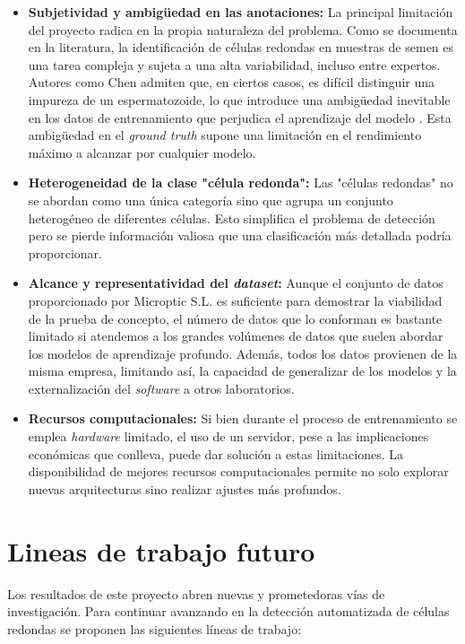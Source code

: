 \documentclass[12pt,a4paper,onecolumn,oneside]{report}
\begin{document}
\begin{itemize}
  \item \textbf{Subjetividad y ambigüedad en las anotaciones:} La principal limitación del proyecto radica en la propia naturaleza del problema. Como se documenta en la literatura, 
  la identificación de células redondas en muestras de semen es una tarea compleja y sujeta a una alta variabilidad, incluso entre expertos. Autores como Chen admiten que,
  en ciertos casos, es difícil distinguir una impureza de un espermatozoide, lo que introduce una ambigüedad inevitable en los datos de entrenamiento que perjudica el aprendizaje del modelo \cite{chen2024}.
  Esta ambigüedad en el \textit{ground truth} supone una limitación en el rendimiento máximo a alcanzar por cualquier modelo.
  \item \textbf{Heterogeneidad de la clase "célula redonda":} Las "células redondas" no se abordan como una única categoría sino que agrupa un conjunto heterogéneo de diferentes células. Esto simplifica el problema de detección pero se pierde información valiosa 
  que una clasificación más detallada podría proporcionar.
  \item \textbf{Alcance y representatividad del \textit{dataset}:} Aunque el conjunto de datos proporcionado por Microptic S.L. \cite{microptic} es suficiente para demostrar la viabilidad de la prueba de concepto, 
  el número de datos que lo conforman es bastante limitado si atendemos a los grandes volúmenes de datos que suelen abordar los modelos de aprendizaje profundo. Además, todos los datos provienen de la misma empresa, limitando así, la capacidad de generalizar de los modelos
  y la externalización del \textit{software} a otros laboratorios.
  \item \textbf{Recursos computacionales:} Si bien durante el proceso de entrenamiento se emplea \textit{hardware} limitado, el uso de un servidor, pese a las implicaciones económicas que conlleva, puede dar solución a estas limitaciones.
  La disponibilidad de mejores recursos computacionales permite no solo explorar nuevas arquitecturas sino realizar ajustes más profundos.
\end{itemize}

\section{Lineas de trabajo futuro}
\label{sec:Lineas de trabajo futuro}

Los resultados de este proyecto abren nuevas y prometedoras vías de investigación. Para continuar avanzando en la detección automatizada de células redondas se proponen las siguientes líneas de trabajo:
\end{document}
